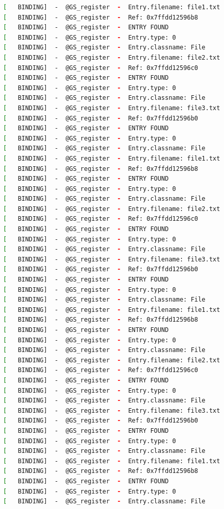 \begin{lstlisting}[language=bash]
[   BINDING]  -  @GS_register  -  Entry.filename: file1.txt
[   BINDING]  -  @GS_register  -  Ref: 0x7ffdd12596b8
[   BINDING]  -  @GS_register  -  ENTRY FOUND
[   BINDING]  -  @GS_register  -  Entry.type: 0
[   BINDING]  -  @GS_register  -  Entry.classname: File
[   BINDING]  -  @GS_register  -  Entry.filename: file2.txt
[   BINDING]  -  @GS_register  -  Ref: 0x7ffdd12596c0
[   BINDING]  -  @GS_register  -  ENTRY FOUND
[   BINDING]  -  @GS_register  -  Entry.type: 0
[   BINDING]  -  @GS_register  -  Entry.classname: File
[   BINDING]  -  @GS_register  -  Entry.filename: file3.txt
[   BINDING]  -  @GS_register  -  Ref: 0x7ffdd12596b0
[   BINDING]  -  @GS_register  -  ENTRY FOUND
[   BINDING]  -  @GS_register  -  Entry.type: 0
[   BINDING]  -  @GS_register  -  Entry.classname: File
[   BINDING]  -  @GS_register  -  Entry.filename: file1.txt
[   BINDING]  -  @GS_register  -  Ref: 0x7ffdd12596b8
[   BINDING]  -  @GS_register  -  ENTRY FOUND
[   BINDING]  -  @GS_register  -  Entry.type: 0
[   BINDING]  -  @GS_register  -  Entry.classname: File
[   BINDING]  -  @GS_register  -  Entry.filename: file2.txt
[   BINDING]  -  @GS_register  -  Ref: 0x7ffdd12596c0
[   BINDING]  -  @GS_register  -  ENTRY FOUND
[   BINDING]  -  @GS_register  -  Entry.type: 0
[   BINDING]  -  @GS_register  -  Entry.classname: File
[   BINDING]  -  @GS_register  -  Entry.filename: file3.txt
[   BINDING]  -  @GS_register  -  Ref: 0x7ffdd12596b0
[   BINDING]  -  @GS_register  -  ENTRY FOUND
[   BINDING]  -  @GS_register  -  Entry.type: 0
[   BINDING]  -  @GS_register  -  Entry.classname: File
[   BINDING]  -  @GS_register  -  Entry.filename: file1.txt
[   BINDING]  -  @GS_register  -  Ref: 0x7ffdd12596b8
[   BINDING]  -  @GS_register  -  ENTRY FOUND
[   BINDING]  -  @GS_register  -  Entry.type: 0
[   BINDING]  -  @GS_register  -  Entry.classname: File
[   BINDING]  -  @GS_register  -  Entry.filename: file2.txt
[   BINDING]  -  @GS_register  -  Ref: 0x7ffdd12596c0
[   BINDING]  -  @GS_register  -  ENTRY FOUND
[   BINDING]  -  @GS_register  -  Entry.type: 0
[   BINDING]  -  @GS_register  -  Entry.classname: File
[   BINDING]  -  @GS_register  -  Entry.filename: file3.txt
[   BINDING]  -  @GS_register  -  Ref: 0x7ffdd12596b0
[   BINDING]  -  @GS_register  -  ENTRY FOUND
[   BINDING]  -  @GS_register  -  Entry.type: 0
[   BINDING]  -  @GS_register  -  Entry.classname: File
[   BINDING]  -  @GS_register  -  Entry.filename: file1.txt
[   BINDING]  -  @GS_register  -  Ref: 0x7ffdd12596b8
[   BINDING]  -  @GS_register  -  ENTRY FOUND
[   BINDING]  -  @GS_register  -  Entry.type: 0
[   BINDING]  -  @GS_register  -  Entry.classname: File

\end{lstlisting}
